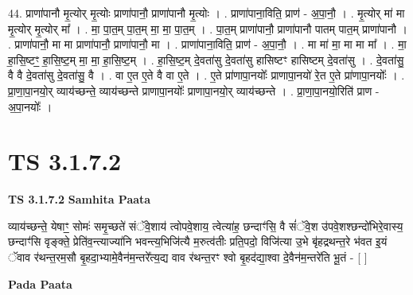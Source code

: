\documentclass[17pt]{extarticle}
\begin{document}
44. प्राणा॑पानौ मृ॒त्योर् मृ॒त्योः प्राणा॑पानौ॒ प्राणा॑पानौ मृ॒त्योः । . प्राणा॑पाना॒विति॒ प्राण॑ - अ॒पा॒नौ॒ । . मृ॒त्योर् मा॑ मा मृ॒त्योर् मृ॒त्योर् मा᳚ । . मा॒ पा॒त॒म् पा॒त॒म् मा॒ मा॒ पा॒त॒म् । . पा॒त॒म् प्राणा॑पानौ॒ प्राणा॑पानौ पातम् पात॒म् प्राणा॑पानौ । . प्राणा॑पानौ॒ मा मा प्राणा॑पानौ॒ प्राणा॑पानौ॒ मा । . प्राणा॑पाना॒विति॒ प्राण॑ - अ॒पा॒नौ॒ । . मा मा॑ मा॒ मा मा मा᳚ । . मा॒ हा॒सि॒ष्टꣳ॒॒ हा॒सि॒ष्ट॒म् मा॒ मा॒ हा॒सि॒ष्ट॒म् । . हा॒सि॒ष्ट॒म् दे॒वता॑सु दे॒वता॑सु हासिष्टꣳ हासिष्टम् दे॒वता॑सु । . दे॒वता॑सु॒ वै वै दे॒वता॑सु दे॒वता॑सु॒ वै । . वा ए॒त ए॒ते वै वा ए॒ते । . ए॒ते प्रा॑णापा॒नयोः᳚ प्राणापा॒नयो॑ रे॒त ए॒ते प्रा॑णापा॒नयोः᳚ । . प्रा॒णा॒पा॒नयो॒र् व्याय॑च्छन्ते॒ व्याय॑च्छन्ते प्राणापा॒नयोः᳚ प्राणापा॒नयो॒र् व्याय॑च्छन्ते । . प्रा॒णा॒पा॒नयो॒रिति॑ प्राण - अ॒पा॒नयोः᳚ । \newline
\pagebreak
{}

\section{ TS 3.1.7.2 }

\textbf{TS 3.1.7.2 } \newline
\textbf{Samhita Paata} \newline

व्याय॑च्छन्ते॒ येषाꣳ॒॒ सोमः॑ समृ॒च्छते॑ संॅवे॒शाय॑ त्वोपवे॒शाय॒ त्वेत्या॑ह॒ छन्दाꣳ॑सि॒ वै सं॑ॅवे॒श उ॑पवे॒शश्छन्दो॑भिरे॒वास्य॒ छन्दाꣳ॑सि वृङ्क्ते॒ प्रेति॑व॒न्त्याज्या॑नि भवन्त्य॒भिजि॑त्यै म॒रुत्व॑तीः प्रति॒पदो॒ विजि॑त्या उ॒भे बृ॑हद्रथन्त॒रे भ॑वत इ॒यं ॅवाव र॑थन्त॒रम॒सौ बृ॒हदा॒भ्यामे॒वैन॑म॒न्तरे᳚त्य॒द्य वाव र॑थन्त॒रꣳ श्वो बृ॒हद॑द्या॒श्वा दे॒वैन॑म॒न्तरे॑ति भू॒तं - [  ] \newline

\textbf{Pada Paata} \newline
\end{document}
